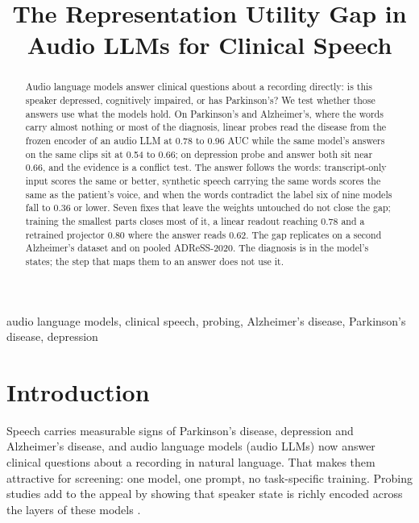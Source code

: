 \documentclass{article}
\begin{document}
\ninept

\title{The Representation Utility Gap in Audio LLMs for Clinical Speech}

\address{University of Southern California, Los Angeles, CA, USA}

\maketitle

\begin{abstract}
Audio language models answer clinical questions about a recording directly: is this speaker
depressed, cognitively impaired, or has Parkinson's? We test whether those answers use what the
models hold. On Parkinson's and Alzheimer's, where the words carry almost nothing or most of the
diagnosis, linear probes read the disease from the frozen encoder of an audio LLM at 0.78 to 0.96 AUC
while the same model's answers on the same clips sit at 0.54 to 0.66; on depression probe and answer
both sit near 0.66, and the evidence is a conflict test. The answer follows the words:
transcript-only input scores the same or better, synthetic speech carrying the same words scores the
same as the patient's voice, and when the words contradict the label six of nine models fall to 0.36
or lower. Seven fixes that leave the weights untouched do not close the gap; training the smallest
parts closes most of it, a linear readout reaching 0.78 and a retrained projector 0.80 where the
answer reads 0.62. The gap replicates on a second Alzheimer's dataset and on pooled ADReSS-2020. The
diagnosis is in the model's states; the step that maps them to an answer does not use it.
\end{abstract}

\begin{keywords}
audio language models, clinical speech, probing, Alzheimer's disease, Parkinson's disease, depression
\end{keywords}

\section{Introduction}\label{sec:intro}

Speech carries measurable signs of Parkinson's disease, depression and Alzheimer's disease, and
audio language models (audio LLMs) now answer clinical questions about a recording in natural
language. That makes them attractive for screening: one model, one prompt, no task-specific
training. Probing studies add to the appeal by showing that speaker state is richly encoded across
the layers of these models \cite{probing}.
\end{document}
